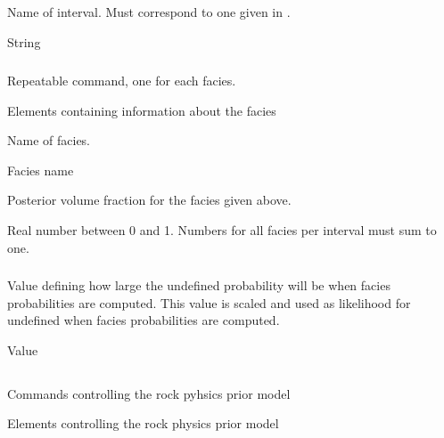 {\subparagraph{}
 \slist
   \item \Description Name of interval. Must correspond to one given in .
   \item \Argument String
   \item \Default
 \elist

\subparagraph{}
 \slist
   \item \Description Repeatable command, one for each facies. 
   \item \Argument Elements containing information about the facies
   \item \Default
 \elist

 \slist
   \item \Description Name of facies.
   \item \Argument Facies name
   \item \Default
 \elist

 \slist
   \item \Description Posterior volume fraction for the facies given above.
   \item \Argument Real number between 0 and 1. Numbers for all facies per interval must sum to one.
   \item \Default
 \elist

\subsubsection{}
 \slist
   \item \Description Value defining how large the undefined
     probability will be when facies probabilities are computed. This
     value is scaled and used as likelihood for undefined when facies
     probabilities are computed.
   \item \Argument Value
   \item {}
 \elist

\subsection{}
 \slist
   \item \Description Commands controlling the rock pyhsics prior model
   \item \Argument Elements controlling the rock physics prior model
   \item \Default
 \elist

}
